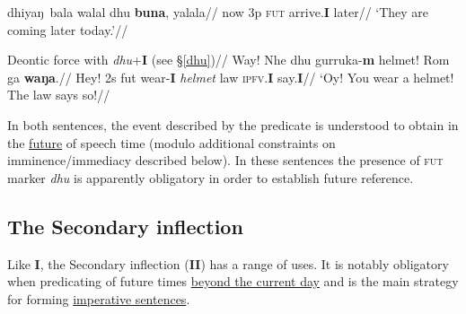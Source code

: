 \a{}\begingl \gla dhiyaŋ~bala walal dhu \textbf{buna}, yalala//
\glb now 3p \textsc{fut} arrive.\textbf{I} later//
\glft`They are coming later today.'//\endgl


\a\begingl\glpreamble Deontic force with \textit{dhu}+\textbf{I} (see §\ref{dhu})//
\gla Way! Nhe dhu gurruka-\textbf{m} helmet! Rom ga \textbf{waŋa}.//
\glb Hey! 2s \gls{fut} wear-\textbf{I} \textit{helmet} law \textsc{ipfv.\textbf{I}}  say.\textbf{I}//
\glft`Oy! You wear a helmet! The law says so!\trailingcitation{[AW~20170730]}//\endgl


\xe


 In both sentences, the event described by the predicate is understood to obtain in the \underline{future} of speech time (modulo additional constraints on imminence/immediacy described below). %
  In these sentences the presence of \textsc{fut} marker \textit{dhu} is apparently obligatory in order to establish future reference. %

\subsection{The Secondary inflection}\label{desc-ii}

Like \textbf{I}, the Secondary inflection (\textbf{II}) has a range of uses. It is notably obligatory when predicating of future times \underline{beyond the current day} and is the main strategy for forming \underline{imperative sentences}.

